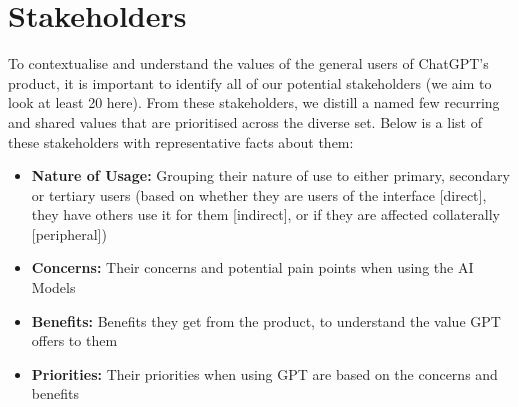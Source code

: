 \newpage
\section{Stakeholders}

To contextualise and understand the values of the general users of ChatGPT's product, it is important to identify all of our potential stakeholders (we aim to look at least 20 here). From these stakeholders, we distill a named few recurring and shared values that are prioritised across the diverse set. Below is a list of these stakeholders with representative facts about them:

\begin{itemize}
\item \textbf{Nature of Usage:} Grouping their nature of use to either primary, secondary or tertiary users (based on whether they are users of the interface [direct], they have others use it for them [indirect], or if they are affected collaterally [peripheral])
\item \textbf{Concerns:} Their concerns and potential pain points when using the AI Models
\item \textbf{Benefits:} Benefits they get from the product, to understand the value GPT offers to them
\item \textbf{Priorities:} Their priorities when using GPT are based on the concerns and benefits
\end{itemize}


